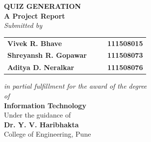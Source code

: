 \begin{titlepage}
\begin{center}
\LARGE{\bf{QUIZ GENERATION\\}}	%
\Large{\bf{A Project Report\\}}		%
\Large{\em{Submitted by\\}}
\begin{table}[htbp]
	\begin{center}
	\begin{tabular}{ l c c l }
	\Large\bf{Vivek R. Bhave} & & & \Large\bf{111508015} \\[0.3cm] 
	\Large\bf{Shreyansh R. Gopawar} & & & \Large\bf{111508073} \\[0.3cm]
	\Large\bf{Aditya D. Neralkar} & & & \Large\bf{111508076} \\
	\end{tabular}
	\end{center}
	\end{table}
\Large{\em{in partial fulfillment for the award of the degree\\ \vspace{1.5pt}of\\}}
\LARGE{\bf{Information Technology\\}}%
\Large{Under the guidance of\\ }
\Large{\bf{Dr. Y. V. Haribhakta}\\}
\Large{College of Engineering, Pune\\}

\end{center}
\end{titlepage}
